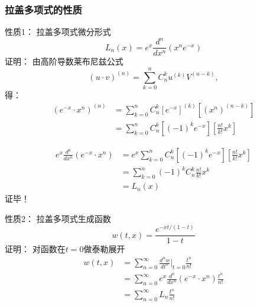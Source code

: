 \begin{frame}
	\frametitle{拉盖多项式的性质}
	\alert{	性质1：}  拉盖多项式微分形式
	\begin{equation*}
		L_n(x) =e^x \frac{d ^n}{d x^n} (x^n e^{-x})
	\end{equation*}	
	\alert{	证明：}  由高阶导数莱布尼兹公式 
	\begin{equation*}
		(u\cdot v) ^{(n)} =\sum_{k=0}^{n} C^k _n u^{(k) }V^{(n-k)}, 
	\end{equation*}	
	得：
	\begin{equation*}
	\begin{split}
		(e^{-x}\cdot x^n) ^{(n)}&= \sum_{k=0}^{n} C^k _n [ e ^{-x}]^{(k)}   [(x^n)^{(n-k)}]\\
		&= \sum_{k=0}^{n} C^k _n [(-1)^k e ^{-x}]   [ \frac{n!}{k!} x^k]
	\end{split}		
	\end{equation*}	
\end{frame}		

\begin{frame}
	\begin{equation*}
	\begin{split}
		e^x \frac{d^n }{d x^n} (e^{-x}\cdot x^n) &=e^x \sum_{k=0}^{n} C^k _n [(-1)^k e ^{-x}]   [ \frac{n!}{k!}  x^k]\\
		&= \sum_{k=0}^{n} (-1)^k C^k _n \frac{n!}{k!}x^k  \\
		&=L_n (x)		
	\end{split}		
	\end{equation*}	
	\alert{	证毕！}
\end{frame}		

\begin{frame}
	\alert{	性质2：}  拉盖多项式生成函数
	\begin{equation*}
		w(t,x) =\frac{e^{-xt/(1-t) } } {1-t}
	\end{equation*}	
	\alert{	证明：}  对函数在$t=0$做泰勒展开
	\begin{equation*}
	\begin{split}
		w(t,x) &= \sum_{n=0}^{\infty} \frac{d^n w}{d t^n} |_{t=0} \frac{t^n}{n!}   \\
		&= \sum_{n=0}^{\infty}  e^x \frac{d^n }{d x^n} (e^{-x}\cdot x^n) \frac{t^n}{n!}\\
		&= \sum_{n=0}^{\infty}  L_n  \frac{t^n}{n!}
	\end{split}		
	\end{equation*}	
\end{frame}		

